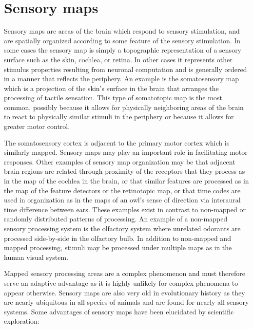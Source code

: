 \documentclass[]{book}
\begin{document}
\hypertarget{sensory-maps}{%
\section{Sensory maps}\label{sensory-maps}}

Sensory maps are areas of the brain which respond to sensory stimulation, and are spatially organized according to some feature of the sensory stimulation. In some cases the sensory map is simply a topographic representation of a sensory surface such as the skin, cochlea, or retina. In other cases it represents other stimulus properties resulting from neuronal computation and is generally ordered in a manner that reflects the periphery. An example is the somatosensory map which is a projection of the skin's surface in the brain that arranges the processing of tactile sensation. This type of somatotopic map is the most common, possibly because it allows for physically neighboring areas of the brain to react to physically similar stimuli in the periphery or because it allows for greater motor control.

The somatosensory cortex is adjacent to the primary motor cortex which is similarly mapped. Sensory maps may play an important role in facilitating motor responses. Other examples of sensory map organization may be that adjacent brain regions are related through proximity of the receptors that they process as in the map of the cochlea in the brain, or that similar features are processed as in the map of the feature detectors or the retinotopic map, or that time codes are used in organization as in the maps of an owl's sense of direction via interaural time difference between ears. These examples exist in contrast to non-mapped or randomly distributed patterns of processing. An example of a non-mapped sensory processing system is the olfactory system where unrelated odorants are processed side-by-side in the olfactory bulb. In addition to non-mapped and mapped processing, stimuli may be processed under multiple maps as in the human visual system.

Mapped sensory processing areas are a complex phenomenon and must therefore serve an adaptive advantage as it is highly unlikely for complex phenomena to appear otherwise. Sensory maps are also very old in evolutionary history as they are nearly ubiquitous in all species of animals and are found for nearly all sensory systems. Some advantages of sensory maps have been elucidated by scientific exploration:
\end{document}
